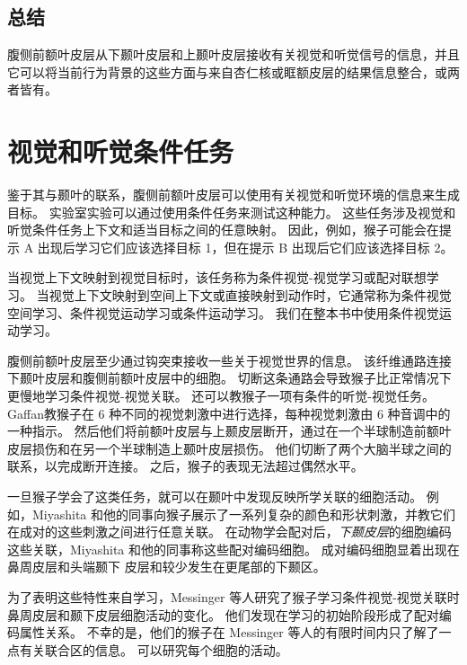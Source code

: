 \subsection{总结}
腹侧前额叶皮层从下颞叶皮层和上颞叶皮层接收有关视觉和听觉信号的信息，并且它可以将当前行为背景的这些方面与来自杏仁核或眶额皮层的结果信息整合\cite{barbas1989architecture}，或两者皆有。


\section{视觉和听觉条件任务}
\par
鉴于其与颞叶的联系，腹侧前额叶皮层可以使用有关视觉和听觉环境的信息来生成目标。 
实验室实验可以通过使用条件任务来测试这种能力。 
这些任务涉及视觉和听觉条件任务上下文和适当目标之间的任意映射。
因此，例如，猴子可能会在提示 A 出现后学习它们应该选择目标 1，但在提示 B 出现后它们应该选择目标 2。
\par


当视觉上下文映射到视觉目标时，该任务称为条件视觉-视觉学习或配对联想学习。 
当视觉上下文映射到空间上下文或直接映射到动作时，它通常称为条件视觉空间学习、条件视觉运动学习或条件运动学习。
我们在整本书中使用条件视觉运动学习。
\par


腹侧前额叶皮层至少通过钩突束接收一些关于视觉世界的信息。 
该纤维通路连接下颞叶皮层和腹侧前额叶皮层中的细胞\cite{ungerleider1989projections}。 
切断这条通路会导致猴子比正常情况下更慢地学习条件视觉-视觉关联\cite{eacott1992inferotemporal,gutnikov1997temporo}。
还可以教猴子一项有条件的听觉-视觉任务。 
Gaffan\cite{gaffan1991auditory}教猴子在 6 种不同的视觉刺激中进行选择，每种视觉刺激由 6 种音调中的一种指示。 
然后他们将前额叶皮层与上颞皮层断开，通过在一个半球制造前额叶皮层损伤和在另一个半球制造上颞叶皮层损伤。 
他们切断了两个大脑半球之间的联系，以完成断开连接。 
之后，猴子的表现无法超过偶然水平。
\par


一旦猴子学会了这类任务，就可以在颞叶中发现反映所学关联的细胞活动。 
例如，Miyashita 和他的同事向猴子展示了一系列复杂的颜色和形状刺激，并教它们在成对的这些刺激之间进行任意关联\cite{sakai1991neural,naya1996activity}。
在动物学会配对后，\textit{下颞皮层}的细胞编码这些关联，Miyashita 和他的同事称这些配对编码细胞。 
成对编码细胞显着出现在鼻周皮层和头端颞下
皮层和较少发生在更尾部的下颞区\cite{naya2001backward}。
\par


为了表明这些特性来自学习，Messinger 等人\cite{messinger2001neuronal}研究了猴子学习条件视觉-视觉关联时鼻周皮层和颞下皮层细胞活动的变化。 
他们发现在学习的初始阶段形成了配对编码属性关系。 
不幸的是，他们的猴子在 Messinger 等人的有限时间内只了解了一点有关联合区的信息。 
可以研究每个细胞的活动。
\par



